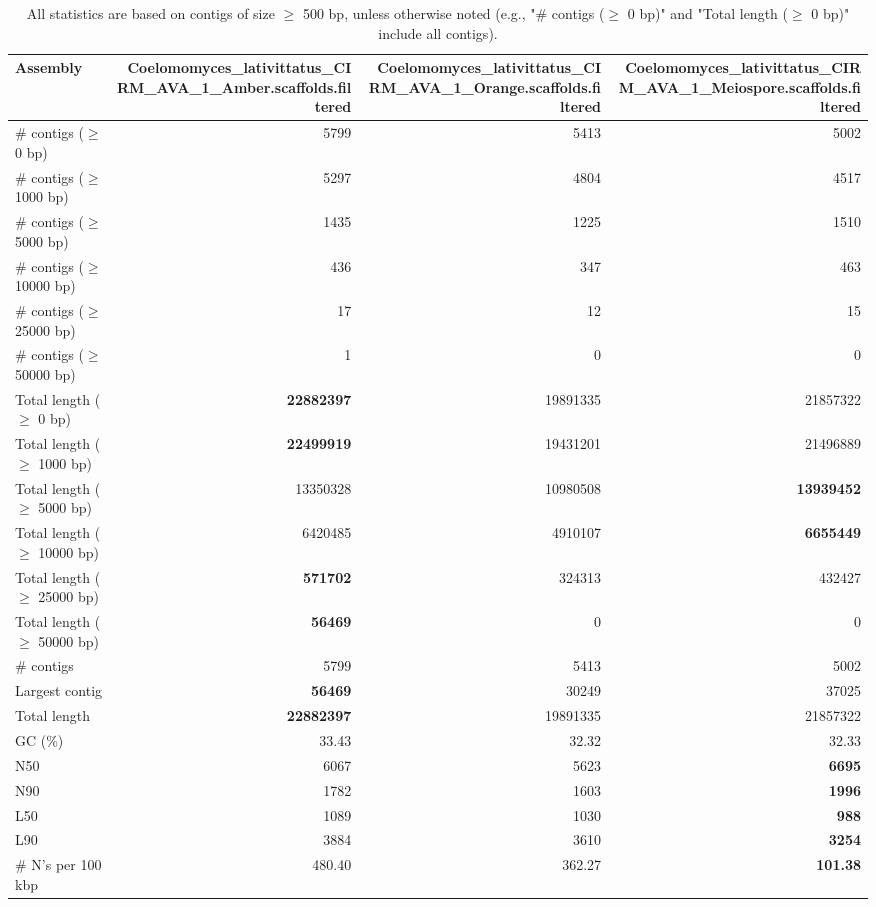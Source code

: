 \documentclass[12pt,a4paper]{article}
\begin{document}
\begin{table}[ht]
\begin{center}
\caption{All statistics are based on contigs of size $\geq$ 500 bp, unless otherwise noted (e.g., "\# contigs ($\geq$ 0 bp)" and "Total length ($\geq$ 0 bp)" include all contigs).}
\begin{tabular}{|l*{3}{|r}|}
\hline
Assembly & Coelomomyces\_lativittatus\_CIRM\_AVA\_1\_Amber.scaffolds.filtered & Coelomomyces\_lativittatus\_CIRM\_AVA\_1\_Orange.scaffolds.filtered & Coelomomyces\_lativittatus\_CIRM\_AVA\_1\_Meiospore.scaffolds.filtered \\ \hline
\# contigs ($\geq$ 0 bp) & 5799 & 5413 & 5002 \\ \hline
\# contigs ($\geq$ 1000 bp) & 5297 & 4804 & 4517 \\ \hline
\# contigs ($\geq$ 5000 bp) & 1435 & 1225 & 1510 \\ \hline
\# contigs ($\geq$ 10000 bp) & 436 & 347 & 463 \\ \hline
\# contigs ($\geq$ 25000 bp) & 17 & 12 & 15 \\ \hline
\# contigs ($\geq$ 50000 bp) & 1 & 0 & 0 \\ \hline
Total length ($\geq$ 0 bp) & {\bf 22882397} & 19891335 & 21857322 \\ \hline
Total length ($\geq$ 1000 bp) & {\bf 22499919} & 19431201 & 21496889 \\ \hline
Total length ($\geq$ 5000 bp) & 13350328 & 10980508 & {\bf 13939452} \\ \hline
Total length ($\geq$ 10000 bp) & 6420485 & 4910107 & {\bf 6655449} \\ \hline
Total length ($\geq$ 25000 bp) & {\bf 571702} & 324313 & 432427 \\ \hline
Total length ($\geq$ 50000 bp) & {\bf 56469} & 0 & 0 \\ \hline
\# contigs & 5799 & 5413 & 5002 \\ \hline
Largest contig & {\bf 56469} & 30249 & 37025 \\ \hline
Total length & {\bf 22882397} & 19891335 & 21857322 \\ \hline
GC (\%) & 33.43 & 32.32 & 32.33 \\ \hline
N50 & 6067 & 5623 & {\bf 6695} \\ \hline
N90 & 1782 & 1603 & {\bf 1996} \\ \hline
L50 & 1089 & 1030 & {\bf 988} \\ \hline
L90 & 3884 & 3610 & {\bf 3254} \\ \hline
\# N's per 100 kbp & 480.40 & 362.27 & {\bf 101.38} \\ \hline
\end{tabular}
\end{center}
\end{table}
\end{document}
